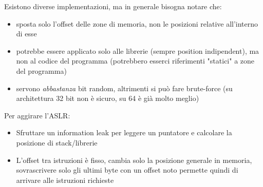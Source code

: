 Esistono diverse implementazioni, ma in generale bisogna notare che:
\begin{itemize}
	\item sposta solo l'offset delle zone di memoria, non le posizioni relative all'interno di esse

	\item potrebbe essere applicato solo alle librerie (sempre position indipendent), ma non al codice del programma (potrebbero esserci riferimenti "statici" a zone del programma)

	\item servono \textit{abbastanza} bit random, altrimenti si può fare brute-force (su architettura 32 bit non è sicuro, su 64 è già molto meglio)
\end{itemize}

Per aggirare l'ASLR: 
\begin{itemize}
    \item Sfruttare un information leak per leggere un puntatore e calcolare la posizione di stack/librerie
    
    \item L'offset tra istruzioni è fisso, cambia solo la posizione generale in memoria, sovrascrivere solo gli ultimi byte con un offset noto permette quindi di arrivare alle istruzioni richieste
\end{itemize}

